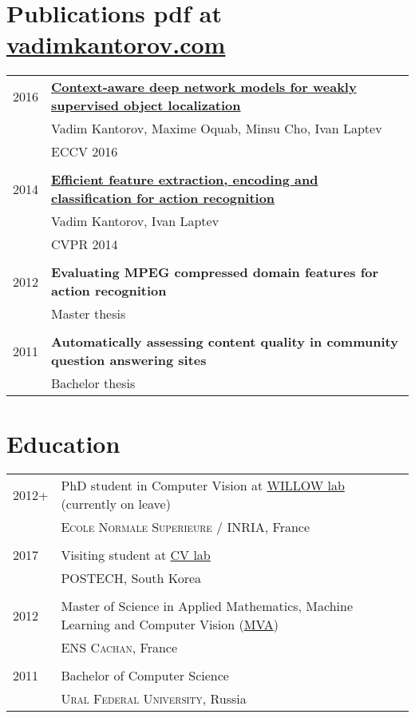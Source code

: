 \documentclass[a4paper,10pt]{article}
\begin{document}
\section{Publications \texorpdfstring{\hfill \footnotesize{pdf at \href{http://vadimkantorov.com}{vadimkantorov.com}}}{}}
\begin{tabular}{ll}
    \\2016\phantom{+} & \textbf{\href{http://arxiv.org/pdf/1609.04331.pdf}{Context-aware deep network models for
weakly supervised object localization}} \\
    & Vadim Kantorov, Maxime Oquab, Minsu Cho, Ivan Laptev \\
    & \textsc{ECCV 2016}\\

    \\2014 & \textbf{\href{http://www.di.ens.fr/willow/research/fastvideofeat/paper/cvpr2014_kantorov_paper.pdf}{Efficient feature extraction, encoding and classification for action recognition}} \\
    & Vadim Kantorov, Ivan Laptev \\
    & \textsc{CVPR 2014}\\
    
    \\2012 & \textbf{Evaluating MPEG compressed domain features for
action recognition}\\
    & Master thesis\\
    
    \\2011 & \textbf{Automatically assessing content quality in community question answering sites}\\
    & Bachelor thesis
\end{tabular}

\section{Education}
\begin{tabular}{ll}
    2012+ & PhD student in Computer Vision at \href{http://www.di.ens.fr/willow/}{WILLOW lab} (currently on leave)\\
    & \textsc{Ecole Normale Superieure / INRIA}, France\\
    
    \\2017 & Visiting student at \href{http://cvlab.postech.ac.kr/lab}{CV lab}\\
    & \textsc{POSTECH}, South Korea\\
        
    \\2012 & Master of Science in Applied Mathematics, Machine Learning and Computer Vision (\href{http://www.cmla.ens-cachan.fr/version-anglaise/academics/mva-master-degree-227777.kjsp}{MVA})\\
    & \textsc{ENS Cachan}, France\\

    \\2011& Bachelor of Computer Science\\
    & \textsc{Ural Federal University}, Russia\\
\end{tabular}
\end{document}
